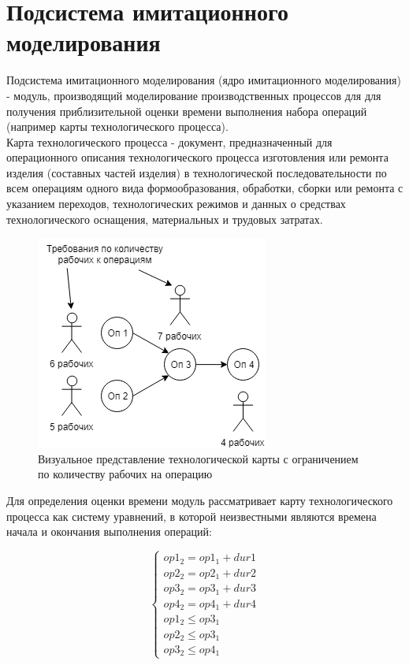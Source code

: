\section{Подсистема имитационного моделирования}
\indent Подсистема имитационного моделирования (ядро имитационного моделирования) - модуль, производящий моделирование производственных процессов для для получения приблизительной оценки времени выполнения набора операций (например карты технологического процесса).\\
\indent Карта технологического процесса - документ, предназначенный для операционного описания технологического процесса изготовления или ремонта изделия (составных частей изделия) в технологической последовательности по всем операциям одного вида формообразования, обработки, сборки или ремонта с указанием переходов, технологических режимов и данных о средствах технологического оснащения, материальных и трудовых затратах.

\begin{figure}[ht]
	\centering
	\includegraphics{pics/techMapViz.png}
	\caption{Визуальное представление технологической карты с ограничением по количеству рабочих на операцию}
	\label{fig:map}
\end{figure}

\indent Для определения оценки времени модуль рассматривает карту технологического процесса как систему уравнений, в которой неизвестными являются времена начала и окончания выполнения операций:

\begin{equation}
	\label{eq:system}
	\begin{cases}
		op1_2 = op1_1 + dur1\\
		op2_2 = op2_1 + dur2\\
		op3_2 = op3_1 + dur3\\
		op4_2 = op4_1 + dur4\\
		op1_2 \leq op3_1\\
		op2_2 \leq op3_1\\
		op3_2 \leq op4_1
	\end{cases}
\end{equation}

